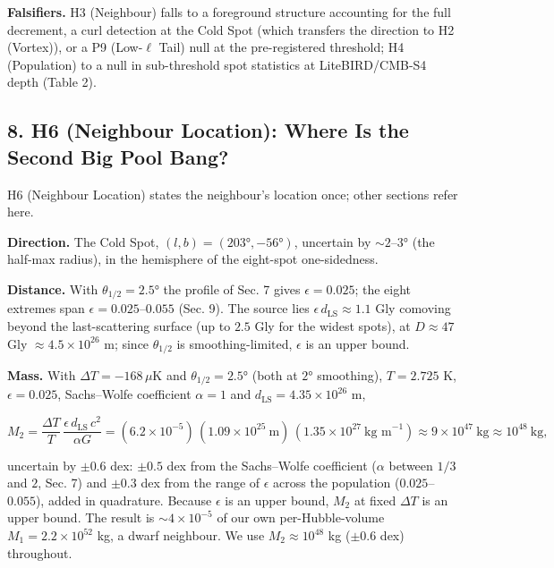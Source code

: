 \documentclass[
]{article}
\begin{document}
\textbf{Falsifiers.} H3 (Neighbour) falls to a foreground structure
accounting for the full decrement, a curl detection at the Cold Spot
(which transfers the direction to H2 (Vortex)), or a P9 (Low-\(\ell\)
Tail) null at the pre-registered threshold; H4 (Population) to a null in
sub-threshold spot statistics at LiteBIRD/CMB-S4 depth (Table 2).

\hypertarget{h6-neighbour-location-where-is-the-second-big-pool-bang}{%
\subsection{\texorpdfstring{\textbf{8. H6 (Neighbour Location): Where Is
the Second Big Pool
Bang?}}{8. H6 (Neighbour Location): Where Is the Second Big Pool Bang?}}\label{h6-neighbour-location-where-is-the-second-big-pool-bang}}

H6 (Neighbour Location) states the neighbour's location once; other
sections refer here.

\textbf{Direction.} The Cold Spot, \((l, b) = (203°, -56°)\), uncertain
by \(\sim\!2\)--\(3°\) (the half-max radius), in the hemisphere of the
eight-spot one-sidedness.

\textbf{Distance.} With \(\theta_{1/2} = 2.5°\) the profile of Sec. 7
gives \(\epsilon = 0.025\); the eight extremes span
\(\epsilon = 0.025\)--\(0.055\) (Sec. 9). The source lies
\(\epsilon\,d_{\text{LS}} \approx 1.1\) Gly comoving beyond the
last-scattering surface (up to \(2.5\) Gly for the widest spots), at
\(D \approx 47\) Gly \(\approx 4.5\times10^{26}\) m; since
\(\theta_{1/2}\) is smoothing-limited, \(\epsilon\) is an upper bound.

\textbf{Mass.} With \(\Delta T = -168\,\mu\)K and
\(\theta_{1/2} = 2.5°\) (both at \(2°\) smoothing), \(T = 2.725\) K,
\(\epsilon = 0.025\), Sachs--Wolfe coefficient \(\alpha = 1\) and
\(d_{\text{LS}} = 4.35\times10^{26}\) m,

\[M_2 = \frac{\Delta T}{T}\,\frac{\epsilon\,d_{\text{LS}}\,c^2}{\alpha G} = (6.2\times10^{-5})\,(1.09\times10^{25}\ \text{m})\,(1.35\times10^{27}\ \text{kg m}^{-1}) \approx 9\times10^{47}\ \text{kg} \approx 10^{48}\ \text{kg},\]

uncertain by \(\pm 0.6\) dex: \(\pm 0.5\) dex from the Sachs--Wolfe
coefficient (\(\alpha\) between \(1/3\) and \(2\), Sec. 7) and
\(\pm 0.3\) dex from the range of \(\epsilon\) across the population
(\(0.025\)--\(0.055\)), added in quadrature. Because \(\epsilon\) is an
upper bound, \(M_2\) at fixed \(\Delta T\) is an upper bound. The result
is \(\sim\!4\times10^{-5}\) of our own per-Hubble-volume
\(M_1 = 2.2\times10^{52}\) kg, a dwarf neighbour. We use
\(M_2 \approx 10^{48}\) kg (\(\pm 0.6\) dex) throughout.
\end{document}
